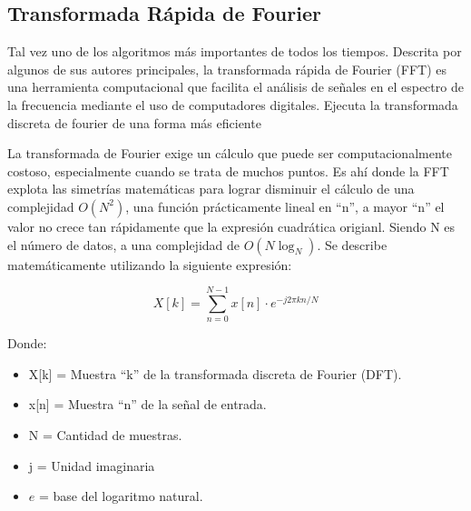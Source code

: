 


\subsection{Transformada Rápida de Fourier} Tal vez uno de los algoritmos más importantes de todos los tiempos. Descrita por algunos de sus autores principales, la transformada rápida de Fourier  (FFT) es una herramienta computacional que facilita el análisis de señales en el espectro de la frecuencia mediante el uso de computadores digitales. Ejecuta la transformada discreta de fourier de una forma más eficiente 

La transformada de Fourier exige un cálculo que puede ser computacionalmente costoso, especialmente cuando se trata de muchos puntos. Es ahí donde la FFT explota las simetrías matemáticas para lograr disminuir el cálculo de una complejidad $O(N^2)$, una función prácticamente lineal en ``n'', a mayor ``n'' el valor no crece tan rápidamente que la expresión cuadrática origianl. Siendo N es el número de datos, a una complejidad de $O(N\log_{N})$. Se describe matemáticamente utilizando la siguiente expresión:

\begin{equation}
    X[k] = \sum_{n=0}^{N-1} x[n] \cdot e^{-j 2 \pi k n / N}
\end{equation}

Donde:

\begin{itemize}
    \item X[k] = Muestra ``k'' de la transformada discreta de Fourier (DFT).
    \item x[n] = Muestra ``n'' de la señal de entrada.
    \item N = Cantidad de muestras.
    \item j = Unidad imaginaria
    \item $e$ = base del logaritmo natural.
\end{itemize}

